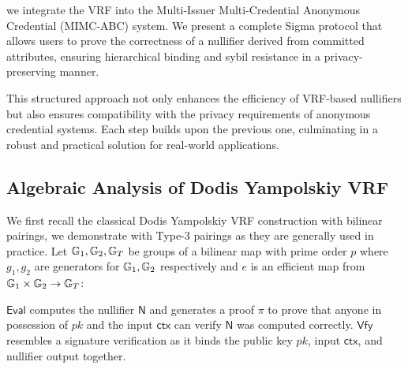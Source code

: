 \begin{enumerate}
    
    
    
    
    we integrate the VRF into the Multi-Issuer Multi-Credential Anonymous Credential (MIMC-ABC) system. We present a complete Sigma protocol that allows users to prove the correctness of a nullifier derived from committed attributes, ensuring hierarchical binding and sybil resistance in a privacy-preserving manner.
\end{enumerate}

This structured approach not only enhances the efficiency of VRF-based nullifiers but also ensures compatibility with the privacy requirements of anonymous credential systems. Each step builds upon the previous one, culminating in a robust and practical solution for real-world applications.













\subsection{Algebraic Analysis of Dodis Yampolskiy VRF}
We first recall the classical Dodis Yampolskiy VRF construction with bilinear pairings, we demonstrate with Type-3 pairings as they are generally used in practice. Let $\mathbb{G}_1, \mathbb{G}_2, \mathbb{G}_T$ be groups of a bilinear map with prime order $p$ where $g_1, g_2$ are generators for $\mathbb{G}_1, \mathbb{G}_2$ respectively and $e$ is an efficient map from $\mathbb{G}_1 \times \mathbb{G}_2 \to \mathbb{G}_T$:


$$ computes the nullifier $\textsf{N}$ and generates a proof $\pi$ to prove that anyone in possession of $pk$ and the input $\textsf{ctx}$ can verify $\textsf{N}$ was computed correctly. $$ resembles a signature verification as it binds  the public key $pk$, input $\textsf{ctx}$, and nullifier output together. 

